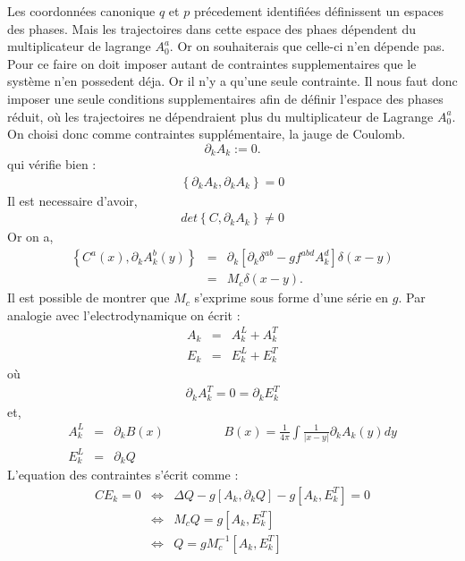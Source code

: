 \documentclass[a4paper,11pt]{article}
\theoremstyle{plain}
\theoremstyle{definition}
\theoremstyle{remark}
\numberwithin{equation}{section}
\numberwithin{equation}{subsection}
\numberwithin{figure}{section}
\begin{document}
\noindent
Les coordonnées canonique $q$ et $p$ précedement identifiées définissent un espaces des phases. Mais les trajectoires dans cette 
espace des phaes dépendent du multiplicateur de lagrange $A^{a}_{0}$. Or on souhaiterais que celle-ci n'en dépende pas. 
Pour ce faire on doit imposer autant de contraintes supplementaires que le système n'en possedent déja. 
Or il n'y a qu'une seule contrainte. Il nous faut donc imposer une seule conditions supplementaires afin de définir 
l'espace des phases réduit, où les trajectoires ne dépendraient plus du multiplicateur de Lagrange $A^{a}_{0}$. On choisi donc comme 
contraintes supplémentaire, la jauge de Coulomb.
\begin{equation}
 \partial_{k} A_{k} := 0.
\end{equation}
qui vérifie bien :
\begin{eqnarray}
 \left \{  \partial_{k} A_{k} , \partial_{k} A_{k} \right \} = 0
\end{eqnarray}
Il est necessaire d'avoir,
\begin{eqnarray}
 det \left \{ C,  \partial_{k} A_{k}  \right \}  \ne  0
\end{eqnarray}
Or on a,
\begin{eqnarray}
  \left \{ C^{a}(x) , \partial_{k} A^{b}_{k} (y) \right \} &=& \partial_{k} \left [ \partial_{k} \delta^{ab} - g f^{abd} A_{k}^{d} \right ] \delta(x-y)  \\
                                                             &=&   M_{c} \delta(x-y).
\end{eqnarray}
Il est possible de montrer que $M_{c}$ s'exprime sous forme d'une série en $g$. Par analogie avec l'electrodynamique on écrit :
\begin{eqnarray}
 A_{k}  &=&   A_{k}^{L}  +   A_{k}^{T}  \\
 E_{k}  &=&   E_{k}^{L}  +  E_{k}^{T}  
\end{eqnarray}
où 
\begin{eqnarray}
 \partial_{k}  A_{k}^{T}  = 0  =  \partial_{k}  E_{k}^{T}
\end{eqnarray}
et,
\begin{eqnarray}
 A_{k}^{L}   &=&  \partial_{k}  B(x)  \hspace{2cm}  B(x) = \frac{1}{4 \pi}  \int \frac{1}{|x-y|}  \partial_{k}  A_{k}  (y)  dy       \\
 E_{k}^{L} &=& \partial_{k}  Q
\end{eqnarray}
L'equation des contraintes s'écrit comme :
\begin{eqnarray}
 C E_{k} = 0 & \Leftrightarrow & \Delta Q - g[A_k , \partial_k Q ] - g[ A_k , E^{T}_{k}  ]  =  0  \\
             & \Leftrightarrow & M_{c} Q =  g[ A_k , E^{T}_{k} ]  \\
             & \Leftrightarrow & Q =  g M_{c}^{-1} [ A_k , E^{T}_{k} ]
\end{eqnarray}
\end{document}
